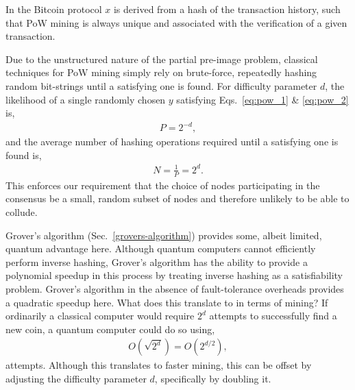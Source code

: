 In the Bitcoin protocol $x$ is derived from a hash of the  transaction history, such that PoW mining is always unique and associated with the verification of a given transaction.

Due to the unstructured nature of the partial pre-image problem, classical techniques for PoW mining simply rely on brute-force, repeatedly hashing random bit-strings until a satisfying one is found. For difficulty parameter $d$, the likelihood of a single randomly chosen $y$ satisfying Eqs.~\eqref{eq:pow_1} \& \eqref{eq:pow_2} is,
\begin{align}
	P=2^{-d},
\end{align}
and the average number of hashing operations required until a satisfying one is found is,
\begin{align}
	N = \frac{1}{P} = 2^d.	
\end{align}
This enforces our requirement that the choice of nodes participating in the consensus be a small, random subset of nodes and therefore unlikely to be able to collude.

Grover's algorithm (Sec.~\ref{grovers-algorithm}) provides some, albeit limited, quantum advantage here. Although quantum computers cannot efficiently perform inverse hashing, Grover's algorithm has the ability to provide a polynomial speedup in this process by treating inverse hashing as a satisfiability problem. Grover's algorithm in the absence of fault-tolerance overheads provides a quadratic speedup here. What does this translate to in terms of mining? If ordinarily a classical computer would require $2^d$ attempts to successfully find a new coin, a quantum computer could do so using, 
\begin{align}
	O(\sqrt{2^d})=O(2^{d/2}),
\end{align}
	attempts. Although this translates to faster mining, this can be offset by adjusting the difficulty parameter $d$, specifically by doubling it.

